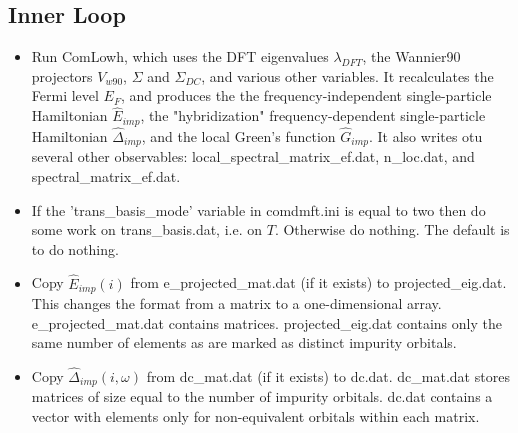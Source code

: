 \documentclass[aps,prb,singlecolumn,preprintnumbers,amsmath,amssymb]{revtex4}
\begin{document}
\subsection{Inner Loop}
\begin{itemize}
\item Run ComLowh, which  uses the DFT eigenvalues $\lambda_{DFT}$, the Wannier90 projectors $V_{w90}$, $\Sigma$ and $\Sigma_{DC}$,  and various other variables.  It recalculates the Fermi level $E_F$,  and produces the the frequency-independent single-particle Hamiltonian $\hat{E}_{imp}$, the "hybridization" frequency-dependent single-particle Hamiltonian $\hat{\Delta}_{imp}$, and the local Green's function $\hat{G}_{imp}$. It also writes otu several other observables: local\_spectral\_matrix\_ef.dat, n\_loc.dat, and spectral\_matrix\_ef.dat.

\item  If the 'trans\_basis\_mode' variable in comdmft.ini is equal to two  then do some work on trans\_basis.dat, i.e. on $T$. Otherwise do nothing. The default is to do nothing.

\item Copy $\hat{E}_{imp}(i)$ from e\_projected\_mat.dat (if it exists) to projected\_eig.dat.   This changes the format from a matrix  to a one-dimensional array.  e\_projected\_mat.dat contains matrices.   projected\_eig.dat contains only the same number of elements as are marked as distinct impurity orbitals.

 \item Copy $\hat{\Delta}_{imp}(i,\omega)$ from dc\_mat.dat (if it exists) to dc.dat. 
 dc\_mat.dat stores matrices of size equal to the number of impurity orbitals. dc.dat contains  a vector with elements only for non-equivalent orbitals within each matrix.


\end{itemize}
\end{document}
